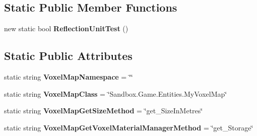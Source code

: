 \subsection*{Static Public Member Functions}
\begin{DoxyCompactItemize}
\item 
\hypertarget{class_s_e_mod_a_p_i_internal_1_1_a_p_i_1_1_entity_1_1_sector_1_1_sector_object_1_1_voxel_map_ae445fe287ef23cb21b42065de1a3844d}{}new static bool {\bfseries Reflection\+Unit\+Test} ()\label{class_s_e_mod_a_p_i_internal_1_1_a_p_i_1_1_entity_1_1_sector_1_1_sector_object_1_1_voxel_map_ae445fe287ef23cb21b42065de1a3844d}

\end{DoxyCompactItemize}
\subsection*{Static Public Attributes}
\begin{DoxyCompactItemize}
\item 
\hypertarget{class_s_e_mod_a_p_i_internal_1_1_a_p_i_1_1_entity_1_1_sector_1_1_sector_object_1_1_voxel_map_a06c76fabd1544fe3062416a2783124c3}{}static string {\bfseries Voxel\+Map\+Namespace} = \char`\"{}\char`\"{}\label{class_s_e_mod_a_p_i_internal_1_1_a_p_i_1_1_entity_1_1_sector_1_1_sector_object_1_1_voxel_map_a06c76fabd1544fe3062416a2783124c3}

\item 
\hypertarget{class_s_e_mod_a_p_i_internal_1_1_a_p_i_1_1_entity_1_1_sector_1_1_sector_object_1_1_voxel_map_ae9ce82807f0eb5727c718c188a888f9c}{}static string {\bfseries Voxel\+Map\+Class} = \char`\"{}Sandbox.\+Game.\+Entities.\+My\+Voxel\+Map\char`\"{}\label{class_s_e_mod_a_p_i_internal_1_1_a_p_i_1_1_entity_1_1_sector_1_1_sector_object_1_1_voxel_map_ae9ce82807f0eb5727c718c188a888f9c}

\item 
\hypertarget{class_s_e_mod_a_p_i_internal_1_1_a_p_i_1_1_entity_1_1_sector_1_1_sector_object_1_1_voxel_map_a5d5cb3ea09cd085e97016790de92bdaf}{}static string {\bfseries Voxel\+Map\+Get\+Size\+Method} = \char`\"{}get\+\_\+\+Size\+In\+Metres\char`\"{}\label{class_s_e_mod_a_p_i_internal_1_1_a_p_i_1_1_entity_1_1_sector_1_1_sector_object_1_1_voxel_map_a5d5cb3ea09cd085e97016790de92bdaf}

\item 
\hypertarget{class_s_e_mod_a_p_i_internal_1_1_a_p_i_1_1_entity_1_1_sector_1_1_sector_object_1_1_voxel_map_a31745dbe301c75e1d713b70d9f3fd6b5}{}static string {\bfseries Voxel\+Map\+Get\+Voxel\+Material\+Manager\+Method} = \char`\"{}get\+\_\+\+Storage\char`\"{}\label{class_s_e_mod_a_p_i_internal_1_1_a_p_i_1_1_entity_1_1_sector_1_1_sector_object_1_1_voxel_map_a31745dbe301c75e1d713b70d9f3fd6b5}

\end{DoxyCompactItemize}
